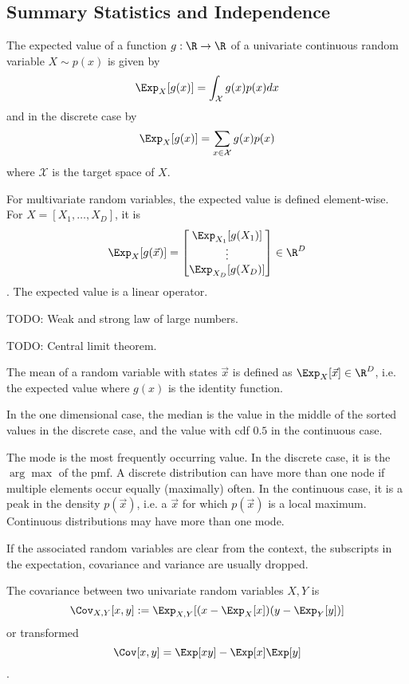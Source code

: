 \subsection{Summary Statistics and Independence}
The expected value of a function $g: \R \to \R$
of a univariate continuous random variable $X \sim p(x)$ is
given by
\begin{equation*}
    \Exp_X[g(x)] = \int_\mathcal{X}{g(x) p(x) dx}
\end{equation*}
and in the discrete case by
\begin{equation*}
    \Exp_X[g(x)] = \sum_{x \in \mathcal{X}}{g(x) p(x)}
\end{equation*}
where $\mathcal{X}$ is the target space of $X$.

For multivariate random variables, the expected value is defined
element-wise. For $X = [X_1, \dotsc, X_D]$, it is
\begin{equation*}
    \Exp_X[g(\vec{x})] =
    \begin{bmatrix}
        \Exp_{X_1}[g(X_1)] \\
        \vdots \\
        \Exp_{X_D}[g(X_D)]
    \end{bmatrix}
    \in \R^D
\end{equation*}.
The expected value is a linear operator.

TODO: Weak and strong law of large numbers.

TODO: Central limit theorem.

The mean of a random variable with states $\vec{x}$ is defined as
$\Exp_X[\vec{x}] \in \R^D$,
i.e. the expected value where $g(x)$ is the identity function.

In the one dimensional case,
the median is the value in the middle of the sorted values in the
discrete case, and the value with cdf $0.5$ in the continuous case.

The mode is the most frequently occurring value.
In the discrete case, it is the $\arg\max$ of the pmf.
A discrete distribution can have more than one node if
multiple elements occur equally (maximally) often.
In the continuous case, it is a peak in the density $p(\vec{x})$,
i.e. a $\vec{x}$ for which $p(\vec{x})$ is a local maximum.
Continuous distributions may have more than one mode.

If the associated random variables are clear from the
context, the subscripts in the expectation,
covariance and variance are usually dropped.

The covariance between two univariate random variables $X, Y$ is
\begin{equation*}
    \Cov_{X, Y}[x, y] :=
        \Exp_{X, Y}[(x - \Exp_X[x]) (y - \Exp_Y[y])]
\end{equation*}
or transformed
\begin{equation*}
    \Cov[x, y] = \Exp[xy] - \Exp[x]\Exp[y]
\end{equation*}.

